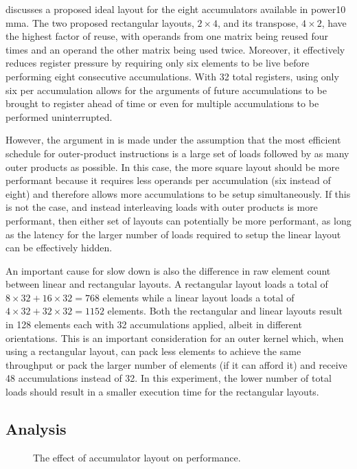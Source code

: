 \documentclass[\main/thesis.tex]{subfiles}
\begin{document}
 discusses a proposed ideal layout for the eight accumulators available in \gls{power10} \gls{mma}.
The two proposed rectangular layouts, $2 \times 4$, and its transpose, $4 \times 2$, have the highest factor of reuse, with operands from one matrix being reused four times and an operand the other matrix being used twice.
Moreover, it effectively reduces register pressure by requiring only six elements to be \gls{live} before performing eight consecutive accumulations.
With 32 total registers, using only six per accumulation allows for the arguments of future accumulations to be brought to register ahead of time or even for multiple accumulations to be performed uninterrupted.

However, the argument in  is made under the assumption that the most efficient schedule for outer-product instructions is a large set of loads followed by as many outer products as possible.
In this case, the more square layout should be more performant because it requires less operands per accumulation (six instead of eight) and therefore allows more accumulations to be setup simultaneously.
If this is not the case, and instead interleaving loads with outer products is more performant, then either set of layouts can potentially be more performant, as long as the latency for the larger number of loads required to setup the linear layout can be effectively hidden.

An important cause for slow down is also the difference in raw element count between linear and rectangular layouts.
A rectangular layout loads a total of $8 \times 32 + 16 \times 32 = 768$ elements while a linear layout loads a total of $4 \times 32 + 32 \times 32 = 1152$ elements.
Both the rectangular and linear layouts result in 128 elements each with 32 accumulations applied, albeit in different orientations.
This is an important consideration for an outer kernel which, when using a rectangular layout, can pack less elements to achieve the same throughput or pack the larger number of elements (if it can afford it) and receive 48 accumulations instead of 32.
In this experiment, the lower number of total loads should result in a smaller execution time for the rectangular layouts.

\subsection{Analysis}
\label{sec:layoutAnalysis}
\begin{figure}[t]
  \centering
  
  \caption{The effect of accumulator layout on performance.}
  \label{fig:tightAccLayout}
\end{figure}
\end{document}
